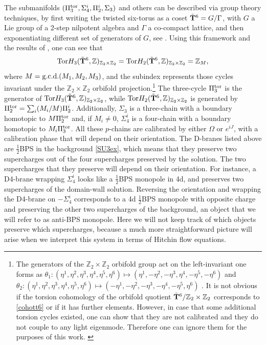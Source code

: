 \documentclass[11pt]{article}
\def\be{\begin{equation}}
\def\ee{\end{equation}}
\def\oh{\frac{1}{2}}
\newcommand{\IZ}{\mathbb{Z}}
\begin{document}
The submanifolds $(\Pi_3^{\rm tor}, \Sigma_4^i, \Pi_2^i, \Sigma_3)$ and others can be described via group theory techniques, by first writing the twisted six-torus as a coset $\tilde{\bf T}^6 = G/\Gamma$, with $G$ a Lie group of a 2-step nilpotent algebra and $\Gamma$ a co-compact lattice, and then exponentiating different set of generators of $G$, see \cite[Appendix A]{Marchesano:2006ns}. Using this framework and the results of \cite{Nomizu1954OnTC,Cenkl2000NILMANIFOLDSAA}, one can see that 
\be
{\rm Tor } H_3 (\tilde{\bf T}^6, \IZ)_{\IZ_2 \times \IZ_2} =  {\rm Tor} H_2 (\tilde{\bf T}^6, \IZ)_{\IZ_2 \times \IZ_2} = \IZ_M ,
\label{cohott6}
\ee
where $M = {\rm g.c.d.} (M_1, M_2, M_3)$, and the subindex represents those cycles invariant under the $\IZ_2 \times \IZ_2$ orbifold projection.\footnote{The generators of the $\IZ_2 \times \IZ_2$ orbifold group act on the left-invariant one forms as $\theta_1: (\eta^1, \eta^2, \eta^3, \eta^4, \eta^5, \eta^6) \mapsto  (\eta^1, -\eta^2, -\eta^3, \eta^4, -\eta^5, -\eta^6)$ and $\theta_2: (\eta^1, \eta^2, \eta^3, \eta^4, \eta^5, \eta^6) \mapsto  (-\eta^1, -\eta^2, -\eta^3, -\eta^4, -\eta^5, \eta^6)$ \cite{Marchesano:2006ns}. It is not obvious if the torsion cohomology of the orbifold quotient $\tilde{\bf T}^6/\IZ_2 \times \IZ_2$ corresponds to \eqref{cohott6} or if it has further elements. However, in case that some additional torsion cycles existed, one can show that they are not calibrated and they do not couple to any light eigenmode. Therefore one can ignore them for the purposes of this work. \label{ft:orbifold}}
The three-cycle $\Pi_3^{\rm tor}$ is the generator of ${\rm Tor } H_3 (\tilde{\bf T}^6, \IZ)_{\IZ_2 \times \IZ_2}$, while ${\rm Tor } H_2 (\tilde{\bf T}^6, \IZ)_{\IZ_2 \times \IZ_2}$ is generated by $\Pi_2^{\rm tor} = \sum_i (M_i/M) \Pi_2^i$. Additionally, $\Sigma_3$ is a three-chain with a boundary homotopic to $M \Pi_2^{\rm tor}$ and, if $M_i \neq 0$, $\Sigma_4^i$ is a four-chain with a boundary homotopic to $M_i \Pi_3^{\rm tor}$. All these $p$-chains are calibrated by either $\Omega$ or $e^{iJ}$, with a calibration phase that will depend on their orientation. The D-branes listed above are $\oh$BPS in the background \eqref{SU3ex}, which means that they preserve two supercharges out of the four supercharges preserved by the solution. The two supercharges that they preserve will depend on their orientation. For instance, a D4-brane wrapping $\Sigma_4^i$ looks like a $\oh$BPS monopole in 4d, and preserves two supercharges of the domain-wall solution. Reversing the orientation and wrapping the D4-brane on $-\Sigma_4^i$ corresponds to a 4d $\oh$BPS monopole with opposite charge and preserving the other two supercharges of the background, an object that we will refer to as anti-BPS monopole. Here we will not keep track of which objects preserve which supercharges, because a much more straightforward picture will arise when we interpret this system in terms of Hitchin flow equations. 
\end{document}
